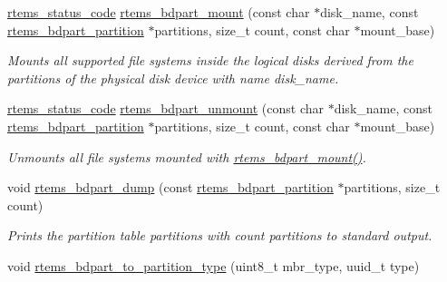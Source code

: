 \begin{DoxyCompactItemize}
\mbox{\hyperlink{group__ClassicStatus_ga545d41846817eaba6143d52ee4d9e9fe}{rtems\+\_\+status\+\_\+code}} \mbox{\hyperlink{group__rtems__bdpart_gaac90511f26e1d224e9e821d4b5c1d064}{rtems\+\_\+bdpart\+\_\+mount}} (const char $\ast$disk\+\_\+name, const \mbox{\hyperlink{structrtems__bdpart__partition}{rtems\+\_\+bdpart\+\_\+partition}} $\ast$partitions, size\+\_\+t count, const char $\ast$mount\+\_\+base)
\begin{DoxyCompactList}\small\item\em Mounts all supported file systems inside the logical disks derived from the partitions of the physical disk device with name {\itshape disk\+\_\+name}. \end{DoxyCompactList}\item 
\mbox{\label{group__rtems__bdpart_ga8240aed18861975cded42f606f4e9107}} 
\mbox{\hyperlink{group__ClassicStatus_ga545d41846817eaba6143d52ee4d9e9fe}{rtems\+\_\+status\+\_\+code}} \mbox{\hyperlink{group__rtems__bdpart_ga8240aed18861975cded42f606f4e9107}{rtems\+\_\+bdpart\+\_\+unmount}} (const char $\ast$disk\+\_\+name, const \mbox{\hyperlink{structrtems__bdpart__partition}{rtems\+\_\+bdpart\+\_\+partition}} $\ast$partitions, size\+\_\+t count, const char $\ast$mount\+\_\+base)
\begin{DoxyCompactList}\small\item\em Unmounts all file systems mounted with \mbox{\hyperlink{group__rtems__bdpart_gaac90511f26e1d224e9e821d4b5c1d064}{rtems\+\_\+bdpart\+\_\+mount()}}. \end{DoxyCompactList}\item 
\mbox{\label{group__rtems__bdpart_gabd436124677aaeaaf2ae4c9f2bb031d2}} 
void \mbox{\hyperlink{group__rtems__bdpart_gabd436124677aaeaaf2ae4c9f2bb031d2}{rtems\+\_\+bdpart\+\_\+dump}} (const \mbox{\hyperlink{structrtems__bdpart__partition}{rtems\+\_\+bdpart\+\_\+partition}} $\ast$partitions, size\+\_\+t count)
\begin{DoxyCompactList}\small\item\em Prints the partition table {\itshape partitions} with {\itshape count} partitions to standard output. \end{DoxyCompactList}\item 
\mbox{\label{group__rtems__bdpart_ga1620402cb457ec28f7712296fa66c04b}} 
void \mbox{\hyperlink{group__rtems__bdpart_ga1620402cb457ec28f7712296fa66c04b}{rtems\+\_\+bdpart\+\_\+to\+\_\+partition\+\_\+type}} (uint8\+\_\+t mbr\+\_\+type, uuid\+\_\+t type)

\end{DoxyCompactItemize}
